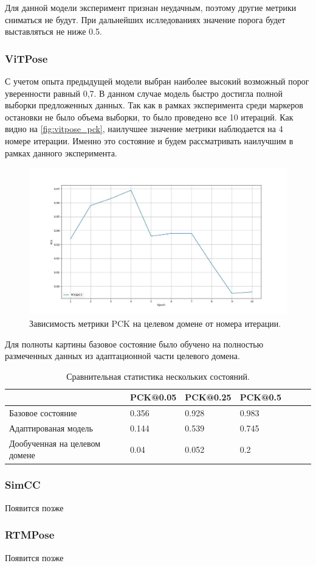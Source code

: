 Для данной модели эксперимент признан неудачным, поэтому другие метрики сниматься не будут. При дальнейших ислледованиях значение порога будет выставляться не ниже 0.5.

\subsubsection*{ViTPose}

С учетом опыта предыдущей модели выбран наиболее высокий возможный порог уверенности равный 0,7. В данном случае модель быстро достигла полной выборки предложенных данных. Так как в рамках эксперимента среди маркеров остановки не было объема выборки, то было проведено все 10 итераций. Как видно на \autoref{fig:vitpose_pck}, наилучшее значение метрики наблюдается на 4 номере итерации. Именно это состояние и будем рассматривать наилучшим в рамках данного эксперимента.

\begin{figure}[h]
	\centering
	\includegraphics[width=\textwidth]{./images/results/vitpose_pck}
	\caption{Зависимость метрики PCK на целевом домене от номера итерации.}
	\label{fig:vitpose_pck}
\end{figure}

Для полноты картины базовое состояние было обучено на полностью размеченных данных из адаптационной части целевого домена. 

\begin{table}[h]
	\centering
	\begin{tabular}{|p{4cm}||p{2.2cm}|p{2.2cm}|p{2cm}|p{2.2cm}|p{2cm}|p{2cm}|}
		\hline
		&PCK@0.05&PCK@0.25&PCK@0.5\\\hline
		\hline
		Базовое состояние & 0.356 & 0.928 & 0.983\\
		\hline
		Адаптированая модель & 0.144 & 0.539 & 0.745\\
		\hline
		Дообученная на целевом домене  & 0.04 & 0.052 & 0.2\\
		\hline
	\end{tabular}
	\caption{Сравнительная статистика нескольких состояний.}
	\label{tab:vitpose_table}
\end{table}

\subsubsection*{SimCC}

Появится позже

\subsubsection*{RTMPose}

Появится позже

\newpage